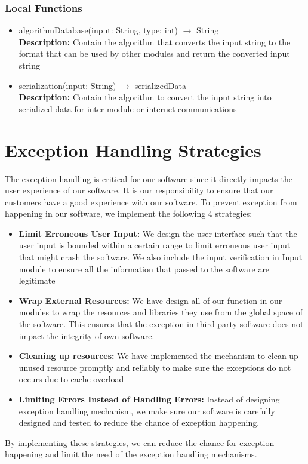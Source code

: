 \documentclass[12pt, titlepage]{article}
\begin{document}
\subsubsection{Local Functions}
\begin{itemize}
\item algorithmDatabase(input: String, type: int) $\rightarrow$ String\\
\textbf{Description:} Contain the algorithm that converts the input string to the format that can be used by other modules and return the converted input string

\item serialization(input: String) $\rightarrow$ serializedData\\
\textbf{Description:} Contain the algorithm to convert the input string into serialized data for inter-module or internet communications
\end{itemize}


\section{Exception Handling Strategies}
The exception handling is critical for our software since it directly impacts the user experience of our software. It is our responsibility to ensure that our customers have a good experience with our software. To prevent exception from happening in our software, we implement the following 4 strategies:
\begin{itemize}
    \item \textbf{Limit Erroneous User Input:} We design the user interface such that the user input is bounded within a certain range to limit erroneous user input that might crash the software. We also include the input verification in Input module to ensure all the information that passed to the software are legitimate
    \item \textbf{Wrap External Resources:} We have design all of our function in our modules to wrap the resources and libraries they use  from the global space of the software. This ensures that the exception in third-party software does not impact the integrity of own software.
    \item \textbf{Cleaning up resources:} We have implemented the mechanism to clean up unused resource promptly and reliably to make sure the exceptions do not occurs due to cache overload
    \item \textbf{Limiting Errors Instead of Handling Errors:} Instead of designing exception handling mechanism, we make sure our software is carefully designed and tested to reduce the chance of exception happening.
\end{itemize}
By implementing these strategies, we can reduce the chance for exception happening and limit the need of the exception handling mechanisms.
\end{document}
